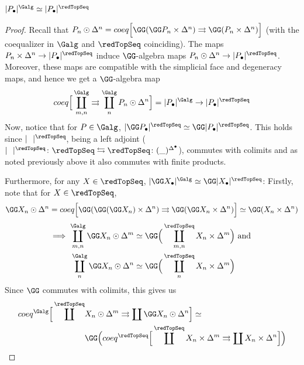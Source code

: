 \documentclass[a4paper,10pt]{amsart}
\begin{document}
\begin{proposition}
	$|P_\bullet|^{\Galg} \simeq |P_\bullet|^{\redTopSeq}$
\end{proposition}
\begin{proof}
	Recall that $P_n \odot \Delta^n = coeq \Big[ \GG(\GG P_n \times \Delta^n) \rightrightarrows \GG(P_n \times \Delta^n) \Big]$ (with the coequalizer in $\Galg$ and $\redTopSeq$ coinciding). The maps $P_n \times \Delta^n \to |P_\bullet|^{\redTopSeq}$ induce $\GG$-algebra maps $P_n \odot \Delta^n \to |P_\bullet|^{\redTopSeq}$. Moreover, these maps are compatible with the simplicial face and degeneracy maps, and hence we get a $\GG$-algebra map
\[ coeq \Big[ \coprod_{m,n}^{\Galg} \rightrightarrows \coprod_{n}^{\Galg} P_n \odot \Delta^n \Big] = |P_\bullet|^{\Galg} \to |P_\bullet|^{\redTopSeq} \]
Now, notice that for $P \in \Galg$, $|\GG P_\bullet|^{\redTopSeq} \simeq \GG|P_\bullet|^{\redTopSeq}$. This holds since $|\ \  |^{\redTopSeq}$, being a left adjoint ($|\ \ |^{\redTopSeq}\colon \redTopSeq \leftrightarrows \redTopSeq \colon (\_)^{\Delta^\bullet}$), commutes with colimits and as noted previously above it also commutes with finite products.

Furthermore, for any $X \in \redTopSeq$, $|\GG X_\bullet|^{\Galg} \simeq \GG |X_\bullet|^{\redTopSeq}$: Firstly, note that for $X \in \redTopSeq$,
\begin{align*}
 \GG X_n \odot \Delta^n = coeq \Big[ \GG (\GG(\GG X_n) \times \Delta^n ) \rightrightarrows \GG(\GG X_n \times \Delta^n) \Big] \simeq \GG(X_n \times \Delta^n) 
\end{align*}
\begin{align*}
\implies \coprod_{m,n}^{\Galg} \GG X_n \odot \Delta^m &\simeq \GG \Big( \coprod_{m,n}^{\redTopSeq} X_n \times \Delta^m \Big) \mbox{ and } \\
 \coprod_{n}^{\Galg} \GG X_n \odot \Delta^n &\simeq \GG \Big( \coprod_{n}^{\redTopSeq} X_n \times \Delta^m \Big) 
\end{align*}
Since $\GG$ commutes with colimits, this gives us
\begin{equation*}\begin{split}
 coeq^{\Galg} \Big[ \coprod^{\redTopSeq} & X_n \odot \Delta^m \rightrightarrows  \coprod \GG X_n \odot \Delta^n\Big] \simeq\\
 & \GG \Big( coeq^{\redTopSeq} \Big[ \coprod^{\redTopSeq} X_n \times \Delta^m \rightrightarrows  \coprod X_n \times \Delta^n \Big] \Big) 
\end{split}
\end{equation*}


\end{proof}
\end{document}
